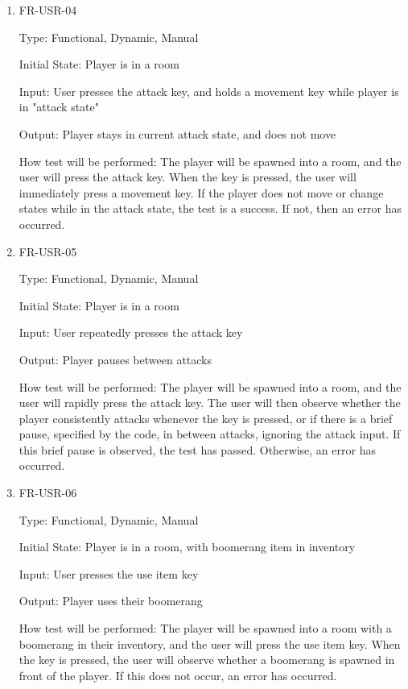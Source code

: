 \documentclass[12pt, titlepage]{article}
\begin{document}
\begin{enumerate}
\item{FR-USR-04\\}

Type: Functional, Dynamic, Manual

Initial State: Player is in a room

Input: User presses the attack key, and holds a movement key while player is in "attack state"

Output: Player stays in current attack state, and does not move

How test will be performed: The player will be spawned into a room, and the user will press the attack key. When the key is pressed,
the user will immediately press a movement key. If the player does not move or change states while in the attack state, the test is a success.
If not, then an error has occurred.

\item{FR-USR-05\\}

Type: Functional, Dynamic, Manual

Initial State: Player is in a room

Input: User repeatedly presses the attack key

Output: Player pauses between attacks

How test will be performed: The player will be spawned into a room, and the user will rapidly press the attack key. The user will
then observe whether the player consistently attacks whenever the key is pressed, or if there is a brief pause, specified by the code, in
between attacks, ignoring the attack input. If this brief pause is observed, the test has passed. Otherwise, an error has occurred.

\item{FR-USR-06\\}

Type: Functional, Dynamic, Manual

Initial State: Player is in a room, with boomerang item in inventory

Input: User presses the use item key

Output: Player uses their boomerang

How test will be performed: The player will be spawned into a room with a boomerang in their inventory, and the user will press the use item key. When the key is pressed,
the user will observe whether a boomerang is spawned in front of the player. If this does not occur, an error has occurred.

\end{enumerate}
\end{document}
